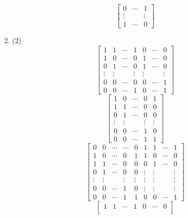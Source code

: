 \documentclass[12pt, A4]{article}
\begin{document}
\begin{enumerate}
\begin{tasks}
						\task
							\[\begin{bmatrix}
								0 & \cdots & 1 \\
								\vdots & & \vdots \\
								1 & \cdots & 0	
							\end{bmatrix}\]
					\end{tasks}
				\item
					\begin{tasks}(2)
						\task
							\[\begin{bmatrix}
								1 & 1 & \cdots & 1 & 0 & \cdots & 0 \\
								1 & 0 & \cdots & 0 & 1 & \cdots & 0 \\
								0 & 1 & \cdots & 0 & 1 & \cdots & 0 \\
								\vdots & \vdots & & \vdots & \vdots & & \vdots \\
								0 & 0 & \cdots & 0 & 0 & \cdots & 1 \\
								0 & 0 & \cdots & 1 & 0 & \cdots & 1
							\end{bmatrix}\]
						\task
							\[\begin{bmatrix}
								1 & 0 & \cdots & 0 & 1 \\
								1 & 1 & \cdots & 0 & 0 \\
								0 & 1 & \cdots & 0 & 0 \\
								\vdots & \vdots & & \vdots & \vdots \\
								0 & 0 & \cdots & 1 & 0 \\
								0 & 0 & \cdots & 1 & 1
							\end{bmatrix}\]
						\task
							\[\begin{bmatrix}
								0 & 0 & \cdots & \cdots & 0 & 1 & 1 & \cdots & 1 \\
								1 & 0 & \cdots & 0 & 1 & 1 & 0 & \cdots & 0 \\
								1 & 1 & \cdots & 0 & 0  & 0 & 1 & \cdots & 0 \\
								0 & 1 & \cdots & 0 & 0  & \vdots & \vdots & & \vdots \\
								\vdots & \vdots & & \vdots & \vdots & \vdots & \vdots & & \vdots \\
								0 & 0 & \cdots & 1 & 0 & \vdots & \vdots & & \vdots \\
								0 & 0 & \cdots & 1 & 1 & 0 & 0 & \cdots & 1
							\end{bmatrix}\]
						\task
							\[\begin{bmatrix}
								1 & 1 & \cdots & 1 & 0 & \cdots & 0 \\

\end{bmatrix}\]
\end{tasks}
\end{enumerate}
\end{document}
